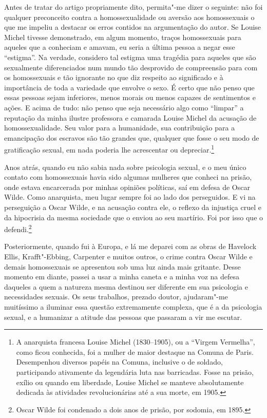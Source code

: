 Antes de tratar do artigo propriamente dito, permita"-me dizer o
seguinte: não foi qualquer preconceito contra a homossexualidade ou
aversão aos homossexuais o que me impeliu a destacar os erros contidos
na argumentação do autor. Se Louise Michel tivesse demonstrado, em algum
momento, traços homossexuais para aqueles que a conheciam e amavam, eu
seria a última pessoa a negar esse ``estigma''. Na verdade, considero tal
estigma uma tragédia para aqueles que são sexualmente diferenciados num
mundo tão desprovido de compreensão para com os homossexuais e tão
ignorante no que diz respeito ao significado e à importância de toda a
variedade que envolve o sexo. É certo que não penso que essas pessoas
sejam inferiores, menos morais ou menos capazes de sentimentos e ações.
E acima de tudo: não penso que seja necessário algo como ``limpar'' a reputação da minha
ilustre professora e camarada Louise Michel da acusação de
homossexualidade. Seu valor para a humanidade, sua contribuição para a
emancipação dos escravos são tão grandes que, qualquer que fosse o seu
modo de gratificação sexual, em nada poderia lhe acrescentar ou
depreciar.\footnote{A anarquista francesa Louise Michel (1830--1905), ou
  a ``Virgem Vermelha'', como ficou conhecida, foi a mulher de maior
  destaque na Comuna de Paris. Desempenhou diversos papéis na Comuna,
  inclusive o de soldado, participando ativamente da legendária luta nas
  barricadas. Fosse na prisão, exílio ou quando em liberdade, Louise
  Michel se manteve absolutamente dedicada às atividades revolucionárias
  até a sua morte, em 1905.}

Anos atrás, quando eu não sabia nada sobre psicologia sexual, e o meu
único contato com homossexuais havia sido algumas mulheres que conheci
na prisão, onde estava encarcerada por minhas opiniões políticas, saí em
defesa de Oscar Wilde. Como anarquista, meu lugar sempre foi ao lado dos
perseguidos. E vi na perseguição a Oscar Wilde, e na acusação contra ele,
o reflexo da injustiça cruel e da hipocrisia da mesma sociedade que o
enviou ao seu martírio. Foi por isso que o defendi.\footnote{Oscar Wilde
  foi condenado a dois anos de prisão, por sodomia, em 1895.}

Posteriormente, quando fui à Europa, e lá me deparei com as obras de
Havelock Ellis, Krafft"-Ebbing, Carpenter e muitos outros, o crime contra
Oscar Wilde e demais homossexuais se apresentou sob uma luz ainda mais
gritante. Desse momento em diante, passei a usar a minha caneta e a
minha voz na defesa daqueles a quem a natureza mesma destinou ser
diferente em sua psicologia e necessidades sexuais. Os seus trabalhos,
prezado doutor, ajudaram"-me muitíssimo a iluminar essa questão
extremamente complexa, que é a da psicologia sexual, e a humanizar a
atitude das pessoas que passaram a vir me escutar.

